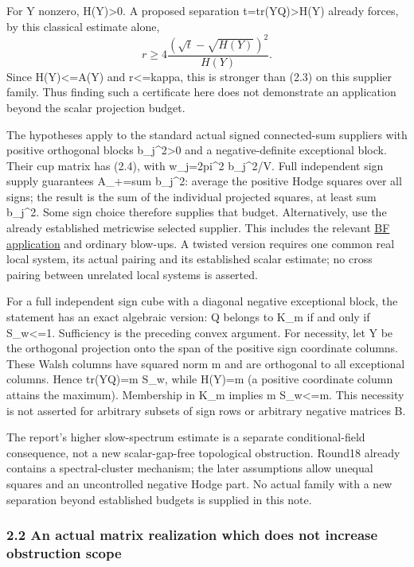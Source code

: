 \documentclass[
  10pt,
]{article}
\begin{document}
For Y nonzero, H(Y)\textgreater0. A proposed separation
t=tr(YQ)\textgreater H(Y) already forces, by this classical estimate
alone, \[
 r\ge4\frac{(\sqrt t-\sqrt{H(Y)})^2}{H(Y)}.              \tag{2.6}
\] Since H(Y)\textless=A(Y) and r\textless=kappa, this is stronger than
(2.3) on this supplier family. Thus finding such a certificate here does
not demonstrate an application beyond the scalar projection budget.

The hypotheses apply to the standard actual signed connected-sum
suppliers with positive orthogonal blocks b\_j\^{}2\textgreater0 and a
negative-definite exceptional block. Their cup matrix has (2.4), with
w\_j=2pi\^{}2 b\_j\^{}2/V. Full independent sign supply guarantees
A\_+=sum b\_j\^{}2: average the positive Hodge squares over all signs;
the result is the sum of the individual projected squares, at least sum
b\_j\^{}2. Some sign choice therefore supplies that budget.
Alternatively, use the already established metricwise selected supplier.
This includes the relevant
\href{../mathematics/current/line1_bauer_furuta_geography.md}{BF
application} and ordinary blow-ups. A twisted version requires one
common real local system, its actual pairing and its established scalar
estimate; no cross pairing between unrelated local systems is asserted.

For a full independent sign cube with a diagonal negative exceptional
block, the statement has an exact algebraic version: Q belongs to K\_m
if and only if S\_w\textless=1. Sufficiency is the preceding convex
argument. For necessity, let Y be the orthogonal projection onto the
span of the positive sign coordinate columns. These Walsh columns have
squared norm m and are orthogonal to all exceptional columns. Hence
tr(YQ)=m S\_w, while H(Y)=m (a positive coordinate column attains the
maximum). Membership in K\_m implies m S\_w\textless=m. This necessity
is not asserted for arbitrary subsets of sign rows or arbitrary negative
matrices B.

The report's higher slow-spectrum estimate is a separate
conditional-field consequence, not a new scalar-gap-free topological
obstruction. Round18 already contains a spectral-cluster mechanism; the
later assumptions allow unequal squares and an uncontrolled negative
Hodge part. No actual family with a new separation beyond established
budgets is supplied in this note.

\hypertarget{an-actual-matrix-realization-which-does-not-increase-obstruction-scope}{%
\subsubsection{2.2 An actual matrix realization which does not increase
obstruction
scope}\label{an-actual-matrix-realization-which-does-not-increase-obstruction-scope}}
\end{document}
